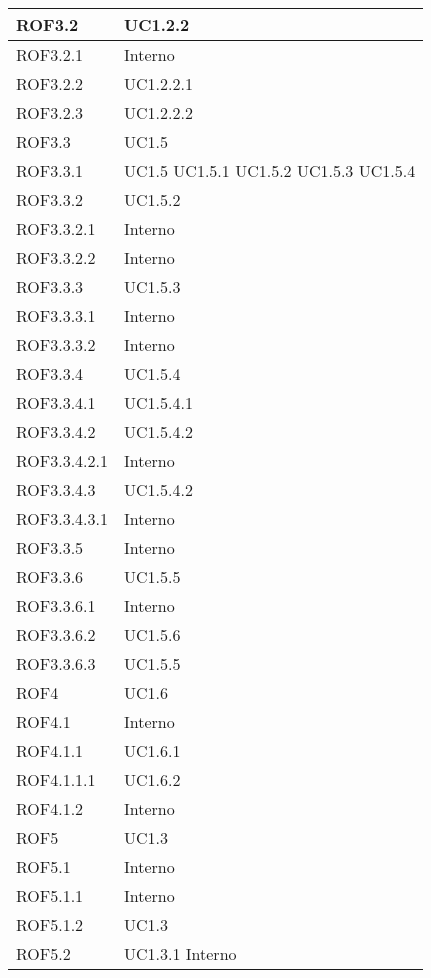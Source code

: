 \begin{center}
\begin{longtable}{| p{4cm} | p{4cm} |}
ROF3.2   &  UC1.2.2 \\
\hline
ROF3.2.1   &  Interno \\
\hline
ROF3.2.2   &  UC1.2.2.1 \\
\hline
ROF3.2.3   &  UC1.2.2.2 \\
\hline
ROF3.3   &  UC1.5 \\
\hline
ROF3.3.1   &  UC1.5 \newline UC1.5.1 \newline UC1.5.2 \newline UC1.5.3 \newline UC1.5.4 \\
\hline
ROF3.3.2   &  UC1.5.2 \\
\hline
ROF3.3.2.1   &  Interno \\
\hline
ROF3.3.2.2   &  Interno \\
\hline
ROF3.3.3   &  UC1.5.3 \\
\hline
ROF3.3.3.1   &  Interno \\
\hline
ROF3.3.3.2   &  Interno \\
\hline
ROF3.3.4   &  UC1.5.4 \\
\hline
ROF3.3.4.1   &  UC1.5.4.1 \\
\hline
ROF3.3.4.2   &  UC1.5.4.2 \\
\hline
ROF3.3.4.2.1   &  Interno \\
\hline
ROF3.3.4.3   &  UC1.5.4.2 \\
\hline
ROF3.3.4.3.1   &  Interno \\
\hline
ROF3.3.5   &  Interno \\
\hline
ROF3.3.6   &  UC1.5.5 \\
\hline
ROF3.3.6.1   &  Interno \\
\hline
ROF3.3.6.2   &  UC1.5.6 \\
\hline
ROF3.3.6.3   &  UC1.5.5 \\
\hline
ROF4   &  UC1.6 \\
\hline
ROF4.1   &  Interno \\
\hline
ROF4.1.1   &  UC1.6.1 \\
\hline
ROF4.1.1.1   &  UC1.6.2 \\
\hline
ROF4.1.2   &  Interno \\
\hline
ROF5   &  UC1.3 \\
\hline
ROF5.1   &  Interno \\
\hline
ROF5.1.1   &  Interno \\
\hline
ROF5.1.2   &  UC1.3 \\
\hline
ROF5.2   &  UC1.3.1 \newline Interno \\

\end{longtable}
\end{center}
